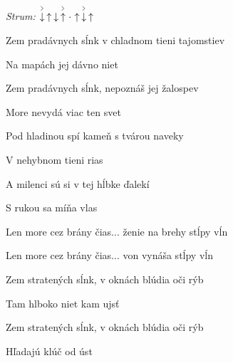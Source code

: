\begin{song}


\begin{headerbox}
\RaiseBoxWithAccents
\textit{Strum:} $\AccentDown\Up\Down\AccentUp\Miss\Up\AccentDown\Up$
\end{headerbox}

\begin{chordbox}
\end{chordbox}

\large

\bigskip


Zem pradávnych sĺnk v chladnom tieni tajomstiev \par
Na mapách jej dávno niet \par
Zem pradávnych sĺnk, nepoznáš jej žalospev \par
More nevydá viac ten svet \par

\bigskip

Pod hladinou spí kameň s tvárou naveky \par
{}V nehybnom tieni rias \par
A milenci sú si v tej hĺbke ďalekí \par
{}S rukou sa míňa vlas \par

\bigskip

Len more cez brány čias... ženie na brehy stĺpy vĺn \par
Len more cez brány čias... von vynáša stĺpy vĺn \par

\bigskip

 \par

\bigskip

Zem stratených sĺnk, v oknách blúdia oči rýb \par
Tam hlboko niet kam ujsť \par
Zem stratených sĺnk, v oknách blúdia oči rýb \par
{}Hľadajú klúč od úst \par


\end{song}

